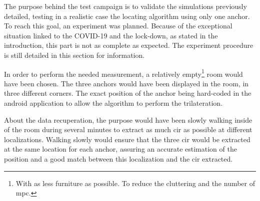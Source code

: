 The purpose behind the test campaign is to validate the simulations previously detailed, testing in a realistic case the locating algorithm using only one anchor. To reach this goal, an experiment was planned. Because of the exceptional situation linked to the COVID-19 and the lock-down, as stated in the introduction, this part is not as complete as expected. The experiment procedure is still detailed in this section for information.
\vspace{2mm}

In order to perform the needed measurement, a relatively empty\footnote{With as less furniture as possible. To reduce the cluttering and the number of \gls{mpc}.} room would have been chosen. The three anchors would have been displayed in the room, in three different corners. The exact position of the anchor being hard-coded in the android application to allow the algorithm to perform the trilateration.
\vspace{2mm}

About the data recuperation, the purpose would have been slowly walking inside of the room during several minutes to extract as much \gls{cir} as possible at different localizations. Walking slowly would ensure that the three \gls{cir} would be extracted at the same location for each anchor, assuring an accurate estimation of the position and a good match between this localization and the \gls{cir} extracted.

